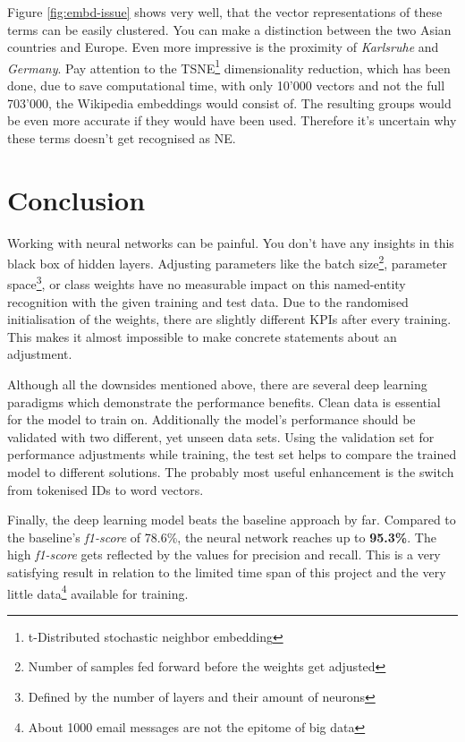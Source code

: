 Figure \ref{fig:embd-issue} shows very well, that the vector representations of these terms can be easily clustered. You can make a distinction between the two Asian countries and Europe. Even more impressive is the proximity of \emph{Karlsruhe} and \emph{Germany}. Pay attention to the TSNE\footnote{t-Distributed stochastic neighbor embedding} dimensionality reduction, which has been done, due to save computational time, with only 10'000 vectors and not the full 703'000, the Wikipedia embeddings would consist of. The resulting groups would be even more accurate if they would have been used. Therefore it's uncertain why these terms doesn't get recognised as NE. 

\section{Conclusion}

Working with neural networks can be painful. You don't have any insights in this black box of hidden layers. Adjusting parameters like the batch size\footnote{Number of samples fed forward before the weights get adjusted}, parameter space\footnote{Defined by the number of layers and their amount of neurons}, or class weights have no measurable impact on this named-entity recognition with the given training and test data. Due to the randomised initialisation of the weights, there are slightly different KPIs after every training. This makes it almost impossible to make concrete statements about an adjustment.

Although all the downsides mentioned above, there are several deep learning paradigms which demonstrate the performance benefits. Clean data is essential for the model to train on. Additionally the model's performance should be validated with two different, yet unseen data sets. Using the validation set for performance adjustments while training, the test set helps to compare the trained model to different solutions. The probably most useful enhancement is the switch from tokenised IDs to word vectors.

Finally, the deep learning model beats the baseline approach by far. Compared to the baseline's \emph{f1-score} of 78.6\%, the neural network reaches up to \textbf{95.3\%}. The high \emph{f1-score} gets reflected by the values for precision and recall. This is a very satisfying result in relation to the limited time span of this project and the very little data\footnote{About 1000 email messages are not the epitome of big data} available for training.
